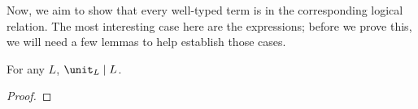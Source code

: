 \documentclass{article}
\newcommand{\ale}{\sqsubseteq}
\newcommand{\iter}[4]{\ms{iter}_{#1}({#2}; \bind{#3}#4)}
\newcommand{\step}{\mapsto}
\newcommand{\steps}{\step^*}
\newcommand{\lr}[2]{#2\mathrel{|}#1}
\newcommand{\lrcx}[3]{#1 \ent \lr{#2}{#3}}
\newcommand{\Val}[1]{\ms{V}[#1]}
\begin{document}
Now, we aim to show that every well-typed term is in the corresponding logical
relation. The most interesting case here are the  expressions; before we
prove this, we will need a few lemmas to help establish those cases.

\begin{lemma}
  For any $L$, $\lr{L}{\unit_L}$.
\end{lemma}
\begin{proof}
  \TODO
\end{proof}





\end{document}
